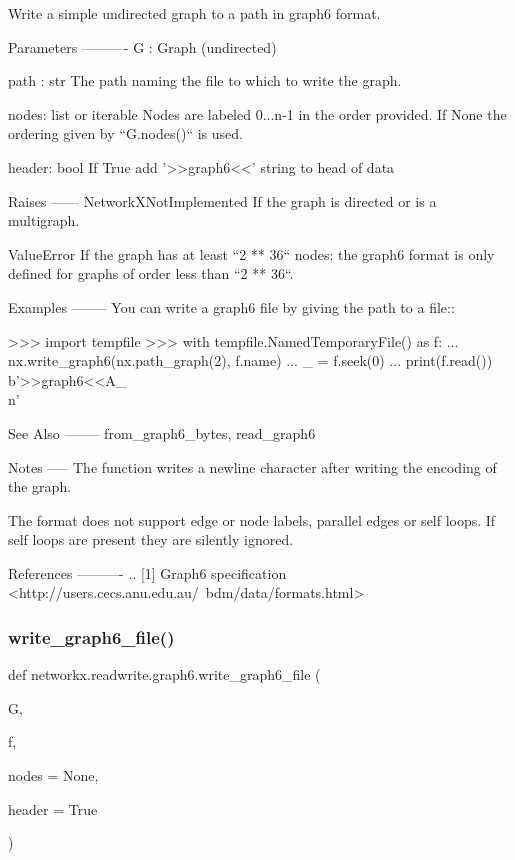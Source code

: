 \begin{DoxyVerb}Write a simple undirected graph to a path in graph6 format.

Parameters
----------
G : Graph (undirected)

path : str
   The path naming the file to which to write the graph.

nodes: list or iterable
   Nodes are labeled 0...n-1 in the order provided.  If None the ordering
   given by ``G.nodes()`` is used.

header: bool
   If True add '>>graph6<<' string to head of data

Raises
------
NetworkXNotImplemented
    If the graph is directed or is a multigraph.

ValueError
    If the graph has at least ``2 ** 36`` nodes; the graph6 format
    is only defined for graphs of order less than ``2 ** 36``.

Examples
--------
You can write a graph6 file by giving the path to a file::

    >>> import tempfile
    >>> with tempfile.NamedTemporaryFile() as f:
    ...     nx.write_graph6(nx.path_graph(2), f.name)
    ...     _ = f.seek(0)
    ...     print(f.read())
    b'>>graph6<<A_\\n'

See Also
--------
from_graph6_bytes, read_graph6

Notes
-----
The function writes a newline character after writing the encoding
of the graph.

The format does not support edge or node labels, parallel edges or
self loops.  If self loops are present they are silently ignored.

References
----------
.. [1] Graph6 specification
       <http://users.cecs.anu.edu.au/~bdm/data/formats.html>\end{DoxyVerb}
 \mbox{\label{namespacenetworkx_1_1readwrite_1_1graph6_a414674908b2f3bd249dcd5bba478e03a}} 
\subsubsection{\texorpdfstring{write\+\_\+graph6\+\_\+file()}{write\_graph6\_file()}}
{\footnotesize\ttfamily def networkx.\+readwrite.\+graph6.\+write\+\_\+graph6\+\_\+file (\begin{DoxyParamCaption}\item[{}]{G,  }\item[{}]{f,  }\item[{}]{nodes = {\ttfamily None},  }\item[{}]{header = {\ttfamily True} }\end{DoxyParamCaption})}

